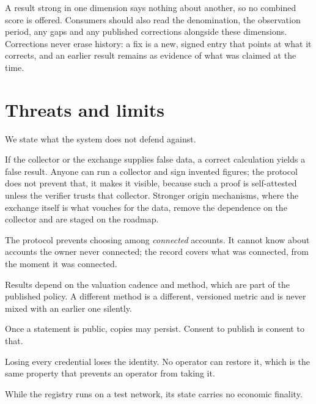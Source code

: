 \documentclass[11pt,a4paper]{article}
\begin{document}
A result strong in one dimension says nothing about another, so no combined score is offered. Consumers should also read the denomination, the observation period, any gaps and any published corrections alongside these dimensions. Corrections never erase history: a fix is a new, signed entry that points at what it corrects, and an earlier result remains as evidence of what was claimed at the time.

\section{Threats and limits}
We state what the system does not defend against.

\begin{description}[leftmargin=1.2em,style=nextline,itemsep=0.4em]
\item[Dishonest source.] If the collector or the exchange supplies false data, a correct calculation yields a false result. Anyone can run a collector and sign invented figures; the protocol does not prevent that, it makes it visible, because such a proof is self-attested unless the verifier trusts that collector. Stronger origin mechanisms, where the exchange itself is what vouches for the data, remove the dependence on the collector and are staged on the roadmap.
\item[Selection outside the system.] The protocol prevents choosing among \emph{connected} accounts. It cannot know about accounts the owner never connected; the record covers what was connected, from the moment it was connected.
\item[Sampling and method.] Results depend on the valuation cadence and method, which are part of the published policy. A different method is a different, versioned metric and is never mixed with an earlier one silently.
\item[Disclosure is permanent.] Once a statement is public, copies may persist. Consent to publish is consent to that.
\item[Key loss.] Losing every credential loses the identity. No operator can restore it, which is the same property that prevents an operator from taking it.
\item[Test network.] While the registry runs on a test network, its state carries no economic finality.
\end{description}

\end{document}
